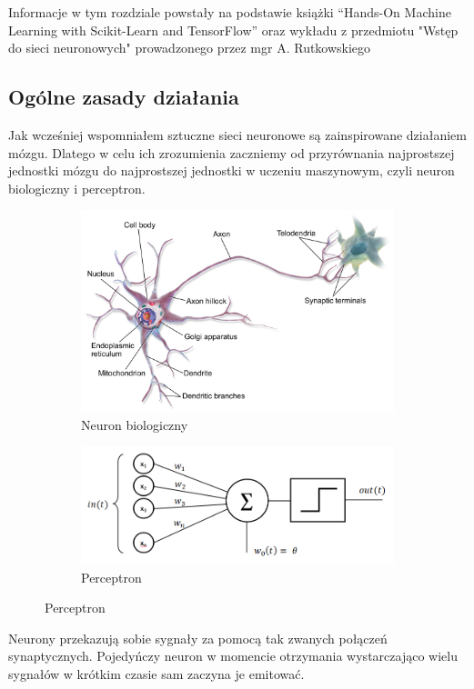 \documentclass{article}
\begin{document}
Informacje w tym rozdziale powstały na podstawie książki ``Hands-On Machine Learning with Scikit-Learn and TensorFlow''\cite{handsonmachinelearning} oraz wykładu z przedmiotu "Wstęp do sieci neuronowych" prowadzonego przez mgr A. Rutkowskiego \cite{wyklad}
\subsection{Ogólne zasady działania}
Jak wcześniej wspomniałem sztuczne sieci neuronowe są zainspirowane działaniem mózgu. Dlatego w celu ich zrozumienia zaczniemy od przyrównania najprostszej jednostki mózgu do najprostszej jednostki w uczeniu maszynowym, czyli neuron biologiczny i perceptron.

\begin{figure}[H]
    \centering
    \begin{subfigure}{0.7\linewidth}
        \includegraphics[width=\linewidth]{images/neuron.png}
        \caption{Neuron biologiczny\cite{neuron-image}}
    \end{subfigure}
    \begin{subfigure}{0.7\linewidth}
        \includegraphics[width=\linewidth]{images/perceptron.png}
        \caption{Perceptron\cite{perceptron-image}}
    \end{subfigure}
\end{figure}
Neurony przekazują sobie sygnały za pomocą tak zwanych połączeń synaptycznych.
Pojedyńczy neuron w momencie otrzymania wystarczająco wielu sygnałów w krótkim czasie sam zaczyna je emitować.
\end{document}
